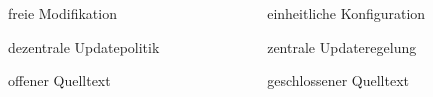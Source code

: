 \begin{frame}
	
	\begin{columns}[T] %
    	\begin{column}[T]{5cm} %
    		\begin{block}{}
				freie Modifikation
			\end{block}
			\begin{block}{}
				dezentrale Updatepolitik
			\end{block}
			\begin{block}{}
				offener Quelltext
			\end{block}
    	\end{column}
    	
    	\begin{column}[T]{5cm} %
    		\begin{block}{}
				einheitliche Konfiguration
			\end{block}
			\begin{block}{}
				zentrale Updateregelung
			\end{block}
			\begin{block}{}
				geschlossener Quelltext
			\end{block}
    	\end{column}
    \end{columns}
     
\end{frame}